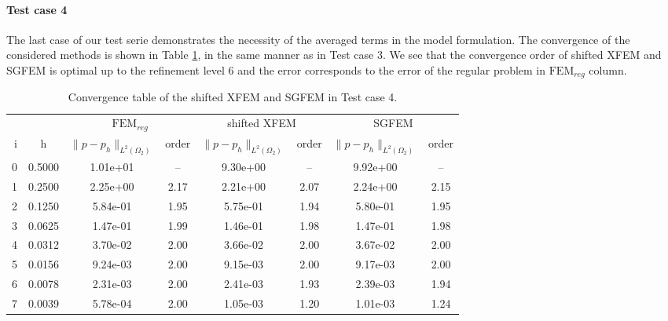 \paragraph{Test case 4}
The last case of our test serie demonstrates the necessity of the averaged terms in the model formulation.
The convergence of the considered methods is shown in Table \ref{tab:convergence_test4}, in the same manner as in Test case 3.
We see that the convergence order of shifted XFEM and SGFEM is optimal up to the refinement level 6 and the error corresponds to
the error of the regular problem in $\textrm{FEM}_{reg}$ column. 
%
\begin{table}[!htb]
\begin{center}
\bgroup
\def\arraystretch{1.2}
\setlength\tabcolsep{5pt}
\begin{tabular}{rc|cc|cc|cc}
\toprule
\multicolumn{2}{c|}{} & \multicolumn{2}{c|}{$\textrm{FEM}_{reg}$} & \multicolumn{2}{c|}{shifted XFEM} & \multicolumn{2}{c}{SGFEM}\\ [3pt] %
i & h & $\|p-p_h\|_{L^2(\Omega_2)}$ & order & $\|p-p_h\|_{L^2(\Omega_2)}$ & order & $\|p-p_h\|_{L^2(\Omega_2)}$ & order \\ [3pt] \midrule
0 & 0.5000 & 1.01e+01 & --   & 9.30e+00 & --   & 9.92e+00 & --   \\ %
1 & 0.2500 & 2.25e+00 & 2.17 & 2.21e+00 & 2.07 & 2.24e+00 & 2.15 \\ %
2 & 0.1250 & 5.84e-01 & 1.95 & 5.75e-01 & 1.94 & 5.80e-01 & 1.95 \\ %
3 & 0.0625 & 1.47e-01 & 1.99 & 1.46e-01 & 1.98 & 1.47e-01 & 1.98 \\ %
4 & 0.0312 & 3.70e-02 & 2.00 & 3.66e-02 & 2.00 & 3.67e-02 & 2.00 \\ %
5 & 0.0156 & 9.24e-03 & 2.00 & 9.15e-03 & 2.00 & 9.17e-03 & 2.00 \\ %
6 & 0.0078 & 2.31e-03 & 2.00 & 2.41e-03 & 1.93 & 2.39e-03 & 1.94 \\ %
7 & 0.0039 & 5.78e-04 & 2.00 & 1.05e-03 & 1.20 & 1.01e-03 & 1.24 \\ %
\bottomrule
\end{tabular}
\egroup
\caption{Convergence table of the shifted XFEM and SGFEM in Test case 4.}
\label{tab:convergence_test4}
\end{center}
\end{table}

